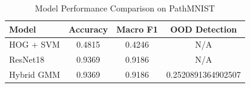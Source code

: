 \begin{table}[h]
\centering
\caption{Model Performance Comparison on PathMNIST}
\label{tab:comparison}
\begin{tabular}{lccc}
\toprule
Model & Accuracy & Macro F1 & OOD Detection \\
\midrule
HOG + SVM & 0.4815 & 0.4246 & N/A \\
ResNet18 & 0.9369 & 0.9186 & N/A \\
Hybrid GMM & 0.9369 & 0.9186 & 0.2520891364902507 \\
\bottomrule
\end{tabular}
\end{table}